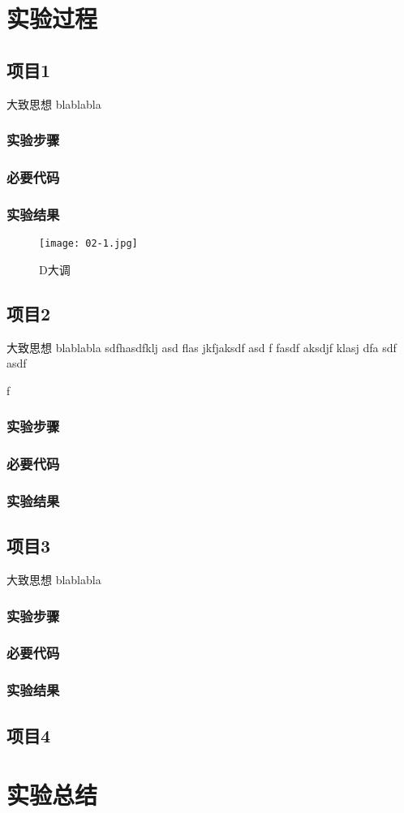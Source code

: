 \section{实验过程}
\subsection{项目1}
大致思想 blablabla
\subsubsection{实验步骤}
\subsubsection{必要代码}

\subsubsection{实验结果}
	\begin{figure}[!bthp]
	\centering
        \texttt{[image: 02-1.jpg]}
        \caption{D大调}
      \end{figure}

\subsection{项目2}
大致思想 blablabla sdfhasdfklj asd flas jkfjaksdf asd f
fasdf aksdjf klasj dfa
sdf
asdf

f
\subsubsection{实验步骤}
\subsubsection{必要代码}
\subsubsection{实验结果}

\subsection{项目3}
大致思想 blablabla
\subsubsection{实验步骤}
\subsubsection{必要代码}
\subsubsection{实验结果}

\subsection{项目4}

\section{实验总结}



